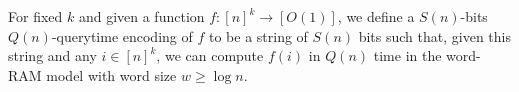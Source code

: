 \begin{definition}[label=def:encoding,restate=DefinitionEncoding]
  For fixed \(k\) and given a function \(f : {[n]}^k \to [O(1)]\), we define
  a \(S(n)\)-bits \(Q(n)\)-querytime encoding of \(f\) to be a string of \(S(n)\) bits such
  that, given this string and any \(i \in {[n]}^k\), we can compute \(f(i)\)
  in \(Q(n)\) time in the word-RAM model with word size \(w \geq \log
  n\).
\end{definition}
